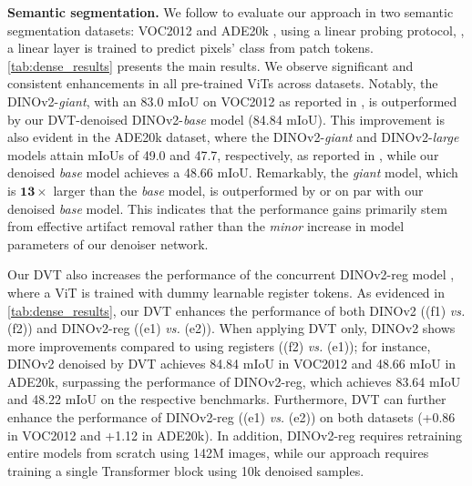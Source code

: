 \documentclass[runningheads]{llncs}
\newcommand{\ours}{DVT\xspace}
\renewcommand{\paragraph}[1]{\vspace{1.25mm}\noindent\textbf{#1}}
\begin{document}
\paragraph{Semantic segmentation.} We follow \cite{oquab2023dinov2,darcet2023vision} to evaluate our approach in two semantic segmentation datasets: VOC2012 \cite{pascal-voc-2012}
and ADE20k \cite{zhou2018semantic}, using a linear probing protocol, \ie, a linear layer is trained to predict pixels' class from patch tokens.
\cref{tab:dense_results}
presents the main results. We observe significant and consistent enhancements in all pre-trained ViTs across datasets. Notably, the DINOv2-\textit{giant}, with an 83.0 mIoU on VOC2012 as reported in \cite{oquab2023dinov2}, is outperformed by our \ours-denoised DINOv2-\textit{base} model (84.84 mIoU). This improvement is also evident in the ADE20k dataset, where the DINOv2-\textit{giant} and DINOv2-\textit{large} models attain mIoUs of 49.0 and 47.7, respectively, as reported in \cite{oquab2023dinov2}, while our denoised \textit{base} model achieves a 48.66 mIoU. Remarkably, the \textit{giant} model, which is $\mathbf{13\times}$ larger than the \textit{base} model, is outperformed by or on par with our denoised \textit{base} model. This indicates that the performance gains primarily stem from effective artifact removal rather than the \textit{minor} increase in model parameters of our denoiser network.

Our \ours also increases the performance of the concurrent DINOv2-reg model \cite{darcet2023vision}, where a ViT is trained with dummy learnable register tokens. As evidenced in \cref{tab:dense_results}, our \ours enhances the performance of both DINOv2 ((f1) \textit{vs.} (f2)) and DINOv2-reg ((e1) \textit{vs.} (e2)). When applying \ours only, DINOv2 shows more improvements compared to using registers ((f2) \textit{vs.} (e1)); for instance, DINOv2 denoised by \ours achieves 84.84 mIoU in VOC2012 and 48.66 mIoU in ADE20k, surpassing the performance of DINOv2-reg, which achieves 83.64 mIoU and 48.22 mIoU on the respective benchmarks. Furthermore, \ours can further enhance the performance of DINOv2-reg ((e1) \textit{vs.} (e2)) on both datasets (+0.86 in VOC2012 and +1.12 in ADE20k).
In addition, DINOv2-reg \cite{darcet2023vision} requires retraining entire models from scratch using 142M images, while our approach requires training a single Transformer block using 10k denoised samples.
\end{document}
